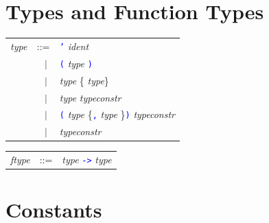 \documentclass[11pt,titlepage,twoside]{report}
\newcommand{\alt}{\;|\;}
\newcommand{\term}[1]{\textcolor{Blue}{\tt #1}}
\newcommand{\nterm}[1]{\textcolor{BrickRed}{\it #1}}
\newcommand{\term}[1]{{\tt #1}}
\newcommand{\nterm}[1]{{\em #1}}
\begin{document}
\section{Types and Function Types\label{typesftypes}} %

\begin{center}
\begin{tabular}{lcl}
\nterm{type} & ::=        & \term{'} \nterm{ident} \\
             & $\;\;\alt$ & \term{(} \nterm{type} \term{)} \\
             & $\;\;\alt$ & \nterm{type} \{\term{*} \nterm{type}\} \\
             & $\;\;\alt$ & \nterm{type} \nterm{typeconstr} \\
             & $\;\;\alt$ & \term{(} \nterm{type} \{\term{,}
                            \nterm{type} \}\term{)} \nterm{typeconstr} \\
             & $\;\;\alt$ & \nterm{typeconstr}
\end{tabular}
\end{center}

\begin{center}
  \begin{tabular}{lcl}
\nterm{ftype} & ::=        & \nterm{type} \term{->} \nterm{type}
  \end{tabular}
\end{center}


\section{Constants\label{constants}} %
\end{document}
